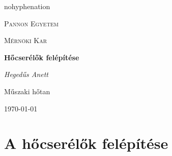 \documentclass[11pt, a4paper]{report}
\author{}
\title{}
\begin{document}
\begin{titlepage}
	\centering
	\begin{hyphenrules}{nohyphenation}
		{\scshape\LARGE Pannon Egyetem \par}
		{\scshape\LARGE Mérnöki Kar \par}
		\vspace{1cm}
		{\scshape\Large \par}
		\vspace{1.5cm}
		\parbox{8cm}{{\centering\huge\bfseries{Hőcserélők felépítése} \par}}
		\vfill
		\vspace{2cm}
		{\Large\itshape Hegedűs Anett\par}
		\vfill
		Műszaki hőtan \par
		\vfill

		{\large \today\par}
	\end{hyphenrules}
\end{titlepage}




\chapter{A hőcserélők felépítése}
\end{document}
